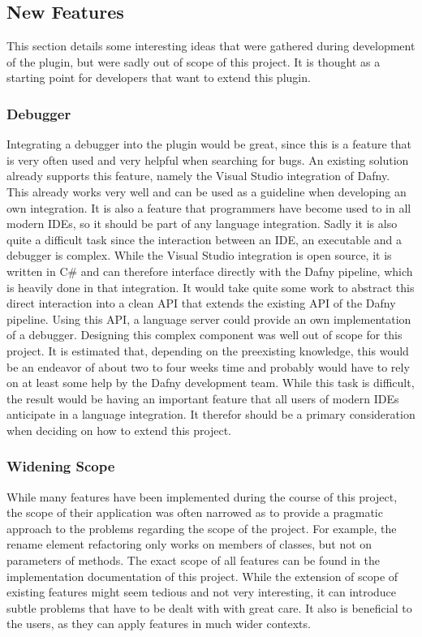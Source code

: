 \subsection{New Features} \label{featureExtensions}
This section details some interesting ideas that were gathered during development of the plugin, but were sadly out of scope of this project. It is thought as a starting point for developers that want to extend this plugin. 
\subsubsection{Debugger}
Integrating a debugger into the plugin would be great, since this is a feature that is very often used and very helpful when searching for bugs. An existing solution already supports this feature, namely the Visual Studio integration \cite{visualstudiodafny} of Dafny. This already works very well and can be used as a guideline when developing an own integration. It is also a feature that programmers have become used to in all modern IDEs, so it should be part of any language integration. \newline
Sadly it is also quite a difficult task since the interaction between an IDE, an executable and a debugger is complex. While the Visual Studio integration is open source, it is written in C\# and can therefore interface directly with the Dafny pipeline, which is heavily done in that integration. It would take quite some work to abstract this direct interaction into a clean API that extends the existing API of the Dafny pipeline. Using this API, a language server could provide an own implementation of a debugger.\newline
Designing this complex component was well out of scope for this project. It is estimated that, depending on the preexisting knowledge, this would be an endeavor of about two to four weeks time and probably would have to rely on at least some help by the Dafny development team. While this task is difficult, the result would be having an important feature that all users of modern IDEs anticipate in a language integration. It therefor should be a primary consideration when deciding on how to extend this project. 
\subsubsection{Widening Scope}
While many features have been implemented during the course of this project, the scope of their application was often narrowed as to provide a pragmatic approach to the problems regarding the scope of the project. For example, the rename element refactoring only works on members of classes, but not on parameters of methods. \newline
The exact scope of all features can be found in the implementation documentation of this project. While the extension of scope of existing features might seem tedious and not very interesting, it can introduce subtle problems that have to be dealt with with great care. It also is beneficial to the users, as they can apply features in much wider contexts. 
